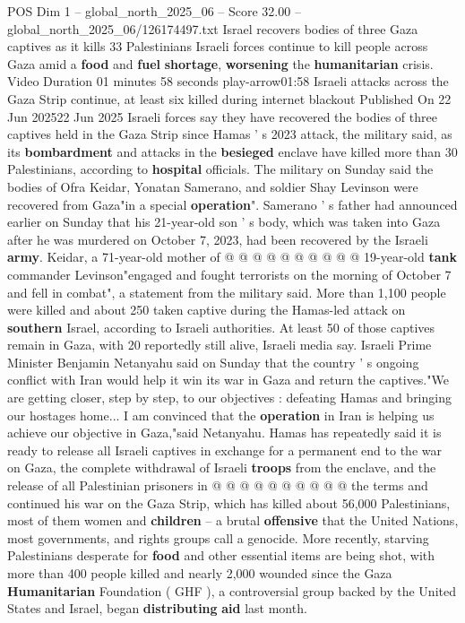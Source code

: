 \begin{textsample}{POS Dim 1 – global\_north\_2025\_06 – Score 32.00 – global\_north\_2025\_06/126174497.txt}  \label{ex:f1_pos_308}
Israel recovers bodies of three Gaza captives as it kills 33 Palestinians Israeli forces continue to kill people across Gaza amid a \textbf{food} and \textbf{fuel} \textbf{shortage}, \textbf{worsening} the \textbf{humanitarian} crisis.
Video Duration 01 minutes 58 seconds play-arrow01:58 Israeli attacks across the Gaza Strip continue, at least six killed during internet blackout Published On 22 Jun 202522 Jun 2025 Israeli forces say they have recovered the bodies of three captives held in the Gaza Strip since Hamas ' s 2023 attack, the military said, as its \textbf{bombardment} and attacks in the \textbf{besieged} enclave have killed more than 30 Palestinians, according to \textbf{hospital} officials.
The military on Sunday said the bodies of Ofra Keidar, Yonatan Samerano, and soldier Shay Levinson were recovered from Gaza"in a special \textbf{operation}".
Samerano ' s father had announced earlier on Sunday that his 21-year-old son ' s body, which was taken into Gaza after he was murdered on October 7, 2023, had been recovered by the Israeli \textbf{army}.
Keidar, a 71-year-old mother of @ @ @ @ @ @ @ @ @ @ 19-year-old \textbf{tank} commander Levinson"engaged and fought terrorists on the morning of October 7 and fell in combat", a statement from the military said.
More than 1,100 people were killed and about 250 taken captive during the Hamas-led attack on \textbf{southern} Israel, according to Israeli authorities.
At least 50 of those captives remain in Gaza, with 20 reportedly still alive, Israeli media say.
Israeli Prime Minister Benjamin Netanyahu said on Sunday that the country ' s ongoing conflict with Iran would help it win its war in Gaza and return the captives."We are getting closer, step by step, to our objectives : defeating Hamas and bringing our hostages home...
I am convinced that the \textbf{operation} in Iran is helping us achieve our objective in Gaza,"said Netanyahu.
Hamas has repeatedly said it is ready to release all Israeli captives in exchange for a permanent end to the war on Gaza, the complete withdrawal of Israeli \textbf{troops} from the enclave, and the release of all Palestinian prisoners in @ @ @ @ @ @ @ @ @ @ the terms and continued his war on the Gaza Strip, which has killed about 56,000 Palestinians, most of them women and \textbf{children} -- a brutal \textbf{offensive} that the United Nations, most governments, and rights groups call a genocide.
More recently, starving Palestinians desperate for \textbf{food} and other essential items are being shot, with more than 400 people killed and nearly 2,000 wounded since the Gaza \textbf{Humanitarian} Foundation ( GHF ), a controversial group backed by the United States and Israel, began \textbf{distributing} \textbf{aid} last month.

\end{textsample}
